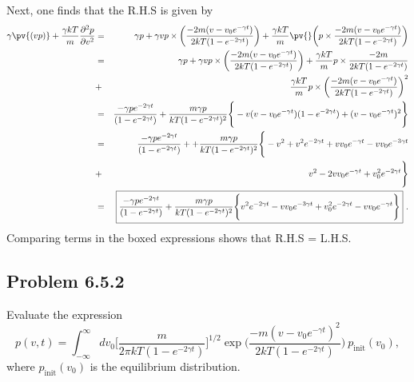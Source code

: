 Next, one finds that the R.H.S is given by
\begin{eqnarray}
\gamma \pv{(vp)} + \frac{\gamma k T}{m} \frac{\partial^2 p}{\partial v^2} &=& \gamma p + \gamma v p \times \bigg( \frac{-2 m (v-v_0 e^{-\gamma t})}{2 k T (1-e^{-2\gamma t})} \bigg) 
+  \frac{\gamma k T}{m} \pv{} \bigg( p \times  \frac{-2 m (v-v_0 e^{-\gamma t})}{2 k T (1-e^{-2\gamma t})}  \bigg) \nonumber \\
&=& \gamma p + \gamma v p \times \bigg( \frac{-2 m (v-v_0 e^{-\gamma t})}{2 k T (1-e^{-2\gamma t})} \bigg) 
+ \frac{\gamma k T}{m}  p \times  \frac{-2 m}{2 k T (1-e^{-2\gamma t})} \nonumber \\
&+& \frac{\gamma k T}{m} p \times \bigg( \frac{-2 m (v-v_0 e^{-\gamma t})}{2 k T (1-e^{-2\gamma t})} \bigg)^2 \nonumber \\
&=& \frac{-\gamma p e^{-2 \gamma t}}{(1-e^{-2 \gamma t})} + \frac{m\gamma p}{k T (1-e^{-2 \gamma t})^2} \Bigg\{ -v (v-v_0 e^{-\gamma t}) (1- e^{-2\gamma t}) +  (v-v_0 e^{-\gamma t})^2\Bigg\} \nonumber \\
&=& \frac{-\gamma p e^{-2 \gamma t}}{(1-e^{-2 \gamma t})} + + \frac{m\gamma p}{k T (1-e^{-2 \gamma t})^2} \Bigg\{ -v^2 + v^2 e^{-2 \gamma t} + v v_0 e^{-\gamma t} - v v_0 e^{-3 \gamma t} \nonumber \\\
&+& v^2 -2 v v_0 e^{-\gamma t} + v_0 ^2 e^{-2 \gamma t} \Bigg\} \nonumber \\
&=& \boxed{\frac{-\gamma p e^{-2 \gamma t}}{(1-e^{-2 \gamma t})} + \frac{m\gamma p}{k T (1-e^{-2 \gamma t})^2} \Bigg\{ v^2 e^{-2 \gamma t} - v v_0 e^{-3 \gamma t} + v_0 ^2 e^{-2 \gamma t} - v v_0 e^{-\gamma t} \Bigg\} }~. \nonumber
\end{eqnarray}
Comparing terms in the boxed expressions shows that R.H.S = L.H.S.


\subsection{Problem 6.5.2}
Evaluate the expression
\begin{equation}
p(v, t) = \int_{-\infty}^{\infty} d v_0 \bigg[\frac{m}{2\pi k T (1-e^{-2\gamma t})}\bigg]^{1/2} \exp\bigg(\frac{-m(v-v_0 e^{-\gamma t})^2}{2 k T (1-e^{-2\gamma t})}\bigg)~p_\text{init}(v_0),
\end{equation}
where $p_\text{init}(v_0)$ is the equilibrium distribution. 

